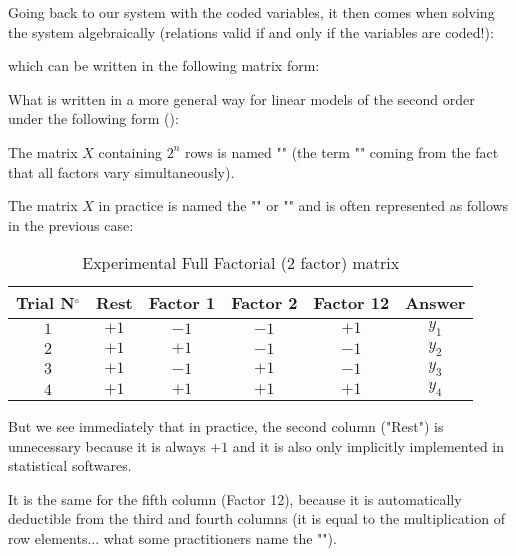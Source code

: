 	Going back to our system with the coded variables, it then comes when solving the system algebraically (relations valid if and only if the variables are coded!):
	
	which can be written in the following matrix form:
	
	What is written in a more general way for linear models of the second order under the following form ():
	
	The matrix $X$ containing $2^n$ rows is named "" (the term "" coming from the fact that all factors vary simultaneously).
	
	The matrix $X$ in practice is named the "" or "" and is often represented as follows in the previous case:
	\begin{table}[H]\centering
	\begin{center}
			\begin{tabular}{|c|c|c|c|c|c|}
				\hline
				\multicolumn{1}{c}{\cellcolor{black!30}\textbf{Trial N${}^\circ$}} & 
  \multicolumn{1}{c}{\cellcolor{black!30}\textbf{Rest}} & 
  \multicolumn{1}{c}{\cellcolor{black!30}\textbf{Factor 1}} & 
  \multicolumn{1}{c}{\cellcolor{black!30}\textbf{Factor 2}} & 
  \multicolumn{1}{c}{\cellcolor{black!30}\textbf{Factor 12}} & 
  \multicolumn{1}{c}{\cellcolor{black!30}\textbf{Answer}} \\ \hline
				 $1$ & $+1$ & $-1$ & $-1$ & $+1$ & $y_1$\\ \hline
				 $2$ & $+1$ & $+1$ & $-1$ & $-1$ & $y_2$\\ \hline
				 $3$ & $+1$ & $-1$ & $+1$ & $-1$ & $y_3$\\ \hline
				 $4$ & $+1$ & $+1$ & $+1$ & $+1$ & $y_4$\\ \hline
		\end{tabular}
	\end{center}
	\caption{Experimental Full Factorial ($2$ factor) matrix}
	\end{table}
	But we see immediately that in practice, the second column ("Rest") is unnecessary because it is always $+1$ and it is also only implicitly implemented in statistical softwares.
	
	It is the same for the fifth column (Factor 12), because it is automatically deductible from the third and fourth columns (it is equal to the multiplication of row elements... what some practitioners name the "").
	
